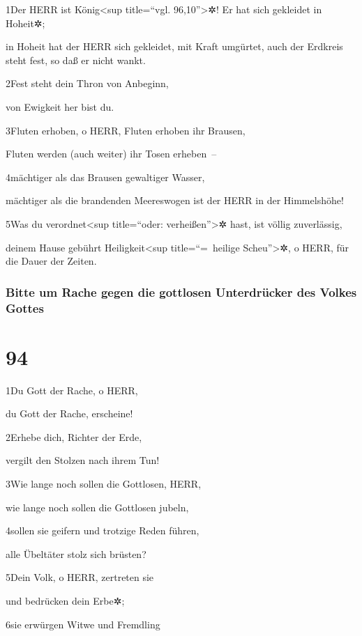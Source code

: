 1Der HERR ist König\textless sup title=``vgl. 96,10''\textgreater✲! Er
hat sich gekleidet in Hoheit✲;

in Hoheit hat der HERR sich gekleidet, mit Kraft umgürtet, auch der
Erdkreis steht fest, so daß er nicht wankt.

2Fest steht dein Thron von Anbeginn,

von Ewigkeit her bist du.

3Fluten erhoben, o HERR, Fluten erhoben ihr Brausen,

Fluten werden (auch weiter) ihr Tosen erheben~--

4mächtiger als das Brausen gewaltiger Wasser,

mächtiger als die brandenden Meereswogen ist der HERR in der
Himmelshöhe!

5Was du verordnet\textless sup title=``oder: verheißen''\textgreater✲
hast, ist völlig zuverlässig,

deinem Hause gebührt Heiligkeit\textless sup title=``=~heilige
Scheu''\textgreater✲, o HERR, für die Dauer der Zeiten.

\hypertarget{bitte-um-rache-gegen-die-gottlosen-unterdruxfccker-des-volkes-gottes}{%
\subsubsection{Bitte um Rache gegen die gottlosen Unterdrücker des
Volkes
Gottes}\label{bitte-um-rache-gegen-die-gottlosen-unterdruxfccker-des-volkes-gottes}}

\hypertarget{section-93}{%
\section{94}\label{section-93}}

1Du Gott der Rache, o HERR,

du Gott der Rache, erscheine!

2Erhebe dich, Richter der Erde,

vergilt den Stolzen nach ihrem Tun!

3Wie lange noch sollen die Gottlosen, HERR,

wie lange noch sollen die Gottlosen jubeln,

4sollen sie geifern und trotzige Reden führen,

alle Übeltäter stolz sich brüsten?

5Dein Volk, o HERR, zertreten sie

und bedrücken dein Erbe✲;

6sie erwürgen Witwe und Fremdling

